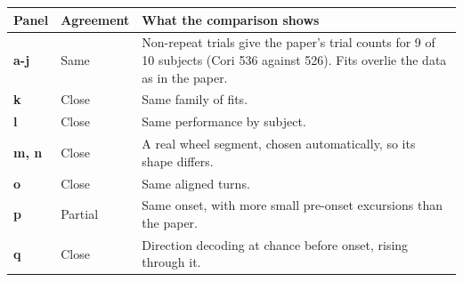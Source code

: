 \begin{longtable}{@{}p{1.1cm}p{2.5cm}p{11.8cm}@{}}
\toprule
Panel & Agreement & What the comparison shows \\
\midrule
\endhead
\textbf{a-j} & Same & Non-repeat trials give the paper's trial counts for 9 of 10 subjects (Cori 536 against 526). Fits overlie the data as in the paper. \\
\textbf{k} & Close & Same family of fits. \\
\textbf{l} & Close & Same performance by subject. \\
\textbf{m, n} & Close & A real wheel segment, chosen automatically, so its shape differs. \\
\textbf{o} & Close & Same aligned turns. \\
\textbf{p} & Partial & Same onset, with more small pre-onset excursions than the paper. \\
\textbf{q} & Close & Direction decoding at chance before onset, rising through it. \\
\bottomrule
\end{longtable}
